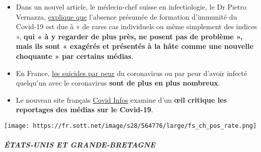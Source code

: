 \begin{itemize}
{  très peu spécifique, incomplète et manque de valeur informative} ».
\item
  Dans un nouvel article, le médecin-chef suisse en infectiologie, le Dr
  Pietro Vernazza,
  \href{https://infekt.ch/2020/04/hinterlaesst-coronavirus-eine-immunitaet/}{explique
  que} l'absence présumée de formation d'immunité du Covid-19 est due à
  « de rares cas individuels ou même simplement des indices »,
  \textbf{qui « à y regarder de plus près, ne posent pas de problème »,
  mais ils sont « exagérés et présentés à la hâte comme une nouvelle
  choquante » par certains médias}.
\item
  En France,
  \href{https://www.midilibre.fr/2020/04/09/coronavirus-ces-suicides-de-malades-ou-de-personnes-tenaillees-par-langoisse,8839373.php}{les
  suicides par peur} du coronavirus ou par peur d'avoir infecté
  quelqu'un avec le coronavirus \textbf{sont de plus en plus nombreux}.
\item
  Le nouveau site français \href{https://covidinfos.net/}{Covid Infos}
  examine d'un \textbf{œil critique les reportages des médias sur le
  Covid-19}.
\end{itemize}

\texttt{[image: https://fr.sott.net/image/s28/564776/large/fs\_ch\_pos\_rate.png]}

\hypertarget{uxe9tats-unis-et-grande-bretagne}{%
\subparagraph{\texorpdfstring{\textbf{ÉTATS-UNIS ET
GRANDE-BRETAGNE}}{ÉTATS-UNIS ET GRANDE-BRETAGNE}}\label{uxe9tats-unis-et-grande-bretagne}}

